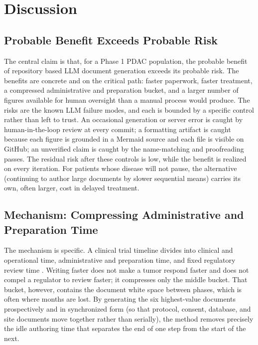 \section{Discussion}

\subsection{Probable Benefit Exceeds Probable Risk}

The central claim is that, for a Phase 1 PDAC population, the probable benefit of
repository based LLM document generation exceeds its probable risk. The benefits are
concrete and on the critical path: faster paperwork, faster treatment, a compressed
administrative and preparation bucket, and a larger number of figures available for
human oversight than a manual process would produce. The risks are the known LLM
failure modes, and each is bounded by a specific control rather than left to trust.
An occasional generation or server error is caught by human-in-the-loop review at
every commit; a formatting artifact is caught because each figure is grounded in a
Mermaid source and each file is visible on GitHub; an unverified claim is caught by
the name-matching and proofreading passes. The residual risk after these controls is
low, while the benefit is realized on every iteration. For patients whose disease
will not pause, the alternative (continuing to author large documents by slower
sequential means) carries its own, often larger, cost in delayed treatment.

\subsection{Mechanism: Compressing Administrative and Preparation Time}

The mechanism is specific. A clinical trial timeline divides into clinical and
operational time, administrative and preparation time, and fixed regulatory review
time \cite{srcDocTypesGem}. Writing faster does not make a tumor respond faster and
does not compel a regulator to review faster; it compresses only the middle bucket.
That bucket, however, contains the document white space between phases, which is
often where months are lost. By generating the six highest-value documents
prospectively and in synchronized form (so that protocol, consent, database, and
site documents move together rather than serially), the method removes precisely the
idle authoring time that separates the end of one step from the start of the next.

